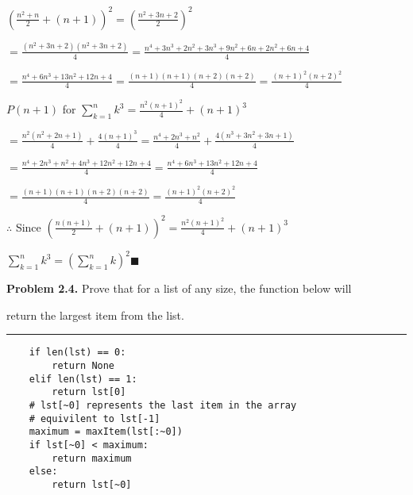 \documentclass{article}
\begin{document}
$\left(\frac{n^2+n}{2} + (n+1)\right)^2 = \left(\frac{n^2+3n+2}{2}\right)^2$

\vspace{0.5cm}

$= \frac{(n^2+3n+2)(n^2+3n+2)}{4} = \frac{n^4+3n^3+2n^2+3n^3+9n^2+6n+2n^2+6n+4}{4}$

\vspace{0.5cm}

$= \frac{n^4+6n^3+13n^2+12n+4}{4} = \frac{(n+1)(n+1)(n+2)(n+2)}{4} = \frac{(n+1)^2(n+2)^2}{4}$

\vspace{1.2cm}

$P(n+1)$ for $\displaystyle\sum_{k=1}^{n} k^3 = \frac{n^2(n+1)^2}{4} + (n+1)^3$

$= \frac{n^2(n^2+2n+1)}{4} + \frac{4(n+1)^3}{4} = \frac{n^4+2n^3+n^2}{4} + \frac{4(n^3+3n^2+3n+1)}{4}$

\vspace{0.3cm}

$= \frac{n^4+2n^3+n^2+4n^3+12n^2+12n+4}{4} = \frac{n^4+6n^3+13n^2+12n+4}{4}$

\vspace{0.3cm}

$= \frac{(n+1)(n+1)(n+2)(n+2)}{4} = \frac{(n+1)^2(n+2)^2}{4}$

\vspace{0.3cm}

$\therefore $ Since $ \left(\frac{n(n+1)}{2} + (n+1) \right)^2 = \frac{n^2(n+1)^2}{4} + (n+1)^3 $ 

$\displaystyle\sum_{k=1}^{n} k^3 = \left( \displaystyle\sum_{k=1}^{n} k \right)^2 \blacksquare $

\vspace{3.2cm}

\textbf{Problem 2.4.} Prove that for a list of any size, the function below will 

return the largest item from the list.

\vspace{0.5cm}

\hrule

\begin{verbatim}
    if len(lst) == 0:
        return None
    elif len(lst) == 1:
        return lst[0]
    # lst[~0] represents the last item in the array
    # equivilent to lst[-1]
    maximum = maxItem(lst[:~0])
    if lst[~0] < maximum:
        return maximum
    else:
        return lst[~0]
\end{verbatim}
\end{document}
